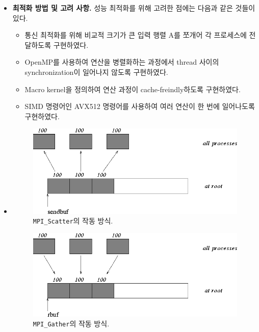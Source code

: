 \begin{itemize}
    \item {
        \textbf{최적화 방법 및 고려 사항.}
        성능 최적화를 위해 고려한 점에는 다음과 같은 것들이 있다.
        \begin{itemize}
            \item 통신 최적화를 위해 비교적 크기가 큰 입력 행렬 A를 쪼개어 각 프로세스에 전달하도록 구현하였다.
            \item OpenMP를 사용하여 연산을 병렬화하는 과정에서 thread 사이의 synchronization이 일어나지 않도록 구현하였다.
            \item Macro kernel을 정의하여 연산 과정이 cache-freindly하도록 구현하였다.
            \item SIMD 명령어인 AVX512 명령어를 사용하여 여러 연산이 한 번에 일어나도록 구현하였다.
        \end{itemize}
    }
    \item {
        \begin{figure}[t]
            \centering
            \includegraphics{imgs/mpi_scatter.png}
            \caption{\texttt{MPI\_Scatter}의 작동 방식\cite{MPIScatter}.}\label{fig:mpi_scatter}
        \end{figure}
        \begin{figure}[t]
            \centering
            \includegraphics{imgs/mpi_gather.png}
            \caption{\texttt{MPI\_Gather}의 작동 방식\cite{MPIGather}.}\label{fig:mpi_gather}
        \end{figure}


}
\end{itemize}
